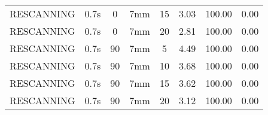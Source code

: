 \begin{table}[H]
\begin{tabular}{|c||c|c|c|c||c|c|c|}
RESCANNING & 0.7s & 0 & 7mm & 15 & 3.03 & 100.00 & 0.00 \\
RESCANNING & 0.7s & 0 & 7mm & 20 & 2.81 & 100.00 & 0.00 \\
RESCANNING & 0.7s & 90 & 7mm & 5 & 4.49 & 100.00 & 0.00 \\
RESCANNING & 0.7s & 90 & 7mm & 10 & 3.68 & 100.00 & 0.00 \\
RESCANNING & 0.7s & 90 & 7mm & 15 & 3.62 & 100.00 & 0.00 \\
RESCANNING & 0.7s & 90 & 7mm & 20 & 3.12 & 100.00 & 0.00 \\
    \hline\hline 
  \end{tabular}
  \label{tab:Pat08_RPV}
\end{table}


\newpage
\thispagestyle{realempty}
\vspace*{-2cm}

